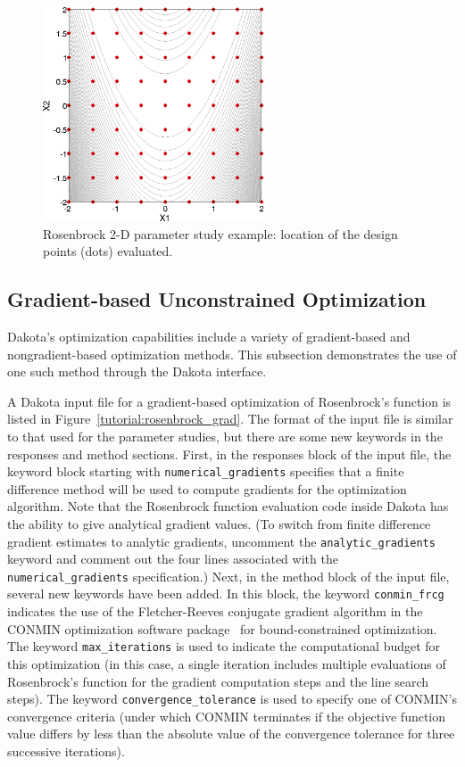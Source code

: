 \begin{figure}[htb!]
  \centering
  \includegraphics[height=2.5in]{images/rosen_2d_pts}
  \caption{Rosenbrock 2-D parameter study example:
  location of the design points (dots) evaluated.}
  \label{tutorial:rosenbrock_multidim_graphics}
\end{figure}


\subsection{Gradient-based Unconstrained Optimization}\label{tutorial:examples:optimization}

Dakota's optimization capabilities include a variety of gradient-based 
and nongradient-based optimization methods. This subsection demonstrates
the use of one such method through the Dakota interface.

A Dakota input file for a gradient-based optimization of Rosenbrock's
function is listed in Figure~\ref{tutorial:rosenbrock_grad}. The
format of the input file is similar to that used for the parameter
studies, but there are some new keywords in the responses and method
sections. First, in the responses block of the input file, the
keyword block starting with \texttt{numerical\_gradients} specifies
that a finite difference method will be used to compute gradients for
the optimization algorithm. Note that the Rosenbrock function
evaluation code inside Dakota has the ability to give analytical
gradient values. (To switch from finite difference gradient estimates
to analytic gradients, uncomment the \texttt{analytic\_gradients}
keyword and comment out the four lines associated with the
\texttt{numerical\_gradients} specification.)
Next, in the method
block of the input file, several new keywords have been added. In
this block, the keyword \texttt{conmin\_frcg} indicates the use of
the Fletcher-Reeves conjugate gradient algorithm in the CONMIN
optimization software package~\cite{Van78} for bound-constrained
optimization. The keyword \texttt{max\_iterations} is used to
indicate the computational budget for this optimization (in this case,
a single iteration includes multiple evaluations of Rosenbrock's
function for the gradient computation steps and the line search
steps). The keyword \texttt{convergence\_tolerance} is used to specify
one of CONMIN's convergence criteria (under which CONMIN terminates if the
objective function value differs by less than the absolute value of
the convergence tolerance for three successive iterations).

